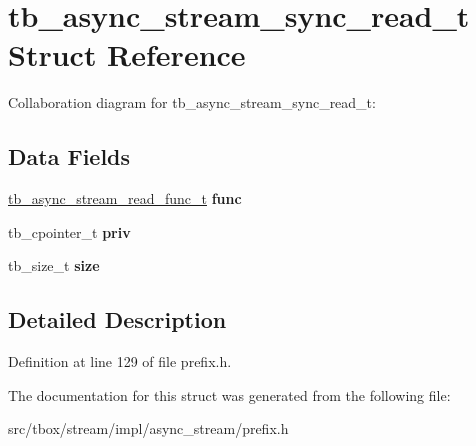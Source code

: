 \hypertarget{structtb__async__stream__sync__read__t}{\section{tb\-\_\-async\-\_\-stream\-\_\-sync\-\_\-read\-\_\-t Struct Reference}
\label{structtb__async__stream__sync__read__t}
}


Collaboration diagram for tb\-\_\-async\-\_\-stream\-\_\-sync\-\_\-read\-\_\-t\-:
\subsection*{Data Fields}
\begin{DoxyCompactItemize}
\item 
\hypertarget{structtb__async__stream__sync__read__t_ac499a9fed29cbf855af93282a637807f}{\hyperlink{async__stream_8h_aca0105f67fde8666e6e0f9b907136634}{tb\-\_\-async\-\_\-stream\-\_\-read\-\_\-func\-\_\-t} {\bfseries func}}\label{structtb__async__stream__sync__read__t_ac499a9fed29cbf855af93282a637807f}

\item 
\hypertarget{structtb__async__stream__sync__read__t_a679ee5ecf3bdff623d99dab2931fa734}{tb\-\_\-cpointer\-\_\-t {\bfseries priv}}\label{structtb__async__stream__sync__read__t_a679ee5ecf3bdff623d99dab2931fa734}

\item 
\hypertarget{structtb__async__stream__sync__read__t_a266fb0f07826162d0b4b1c8b3e208798}{tb\-\_\-size\-\_\-t {\bfseries size}}\label{structtb__async__stream__sync__read__t_a266fb0f07826162d0b4b1c8b3e208798}

\end{DoxyCompactItemize}


\subsection{Detailed Description}


Definition at line 129 of file prefix.\-h.



The documentation for this struct was generated from the following file\-:\begin{DoxyCompactItemize}
\item 
src/tbox/stream/impl/async\-\_\-stream/prefix.\-h\end{DoxyCompactItemize}
